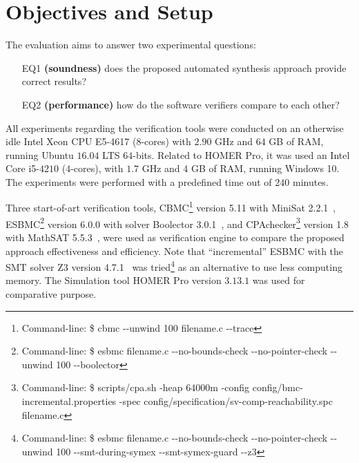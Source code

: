 \section{Objectives and Setup} 

The evaluation aims to answer two experimental questions: 

\begin{enumerate}

\item[EQ1] \textbf{(soundness)} does the proposed automated synthesis approach provide correct results?

\item[EQ2] \textbf{(performance)} how do the software verifiers compare to each other?

\end{enumerate}

All experiments regarding the verification tools were conducted 
on an otherwise idle Intel Xeon CPU E5-4617 ($8$-cores) with 
$2.90$ GHz and $64$ GB of RAM, running Ubuntu $16.04$ LTS $64$-bits. 
Related to HOMER Pro, it was used an Intel Core i5-$4210$ ($4$-cores), 
with $1.7$ GHz and $4$ GB of RAM, running Windows 10. 
The experiments were performed with a predefined time out of $240$ minutes.

Three start-of-art verification tools, CBMC\footnote{Command-line: \$ cbmc -\phantom{}-unwind 100 filename.c -\phantom{}-trace} version 5.11 with MiniSat 2.2.1~\cite{Kroening}, ESBMC\footnote{Command-line: \$ esbmc filename.c -\phantom{}-no-bounds-check -\phantom{}-no-pointer-check -\phantom{}-unwind 100 -\phantom{}-boolector} version 6.0.0 with solver Boolector 3.0.1~\cite{Brummayer}, %
and CPAchecker\footnote{Command-line: \$ scripts/cpa.sh -heap 64000m -config config/bmc-incremental.properties -spec config/specification/sv-comp-reachability.spc filename.c} version 1.8 with MathSAT 5.5.3~\cite{mathsat5}, were used as verification engine to compare the proposed approach effectiveness and efficiency. Note that ``incremental'' ESBMC with the SMT solver Z3 version 4.7.1~\cite{DeMoura} was tried\footnote{Command-line: \$ esbmc filename.c -\phantom{}-no-bounds-check -\phantom{}-no-pointer-check -\phantom{}-unwind 100 -\phantom{}-smt-during-symex -\phantom{}-smt-symex-guard -\phantom{}-z3} as an alternative to use less computing memory. The Simulation tool HOMER Pro version $3.13.1$ was used for comparative purpose.

